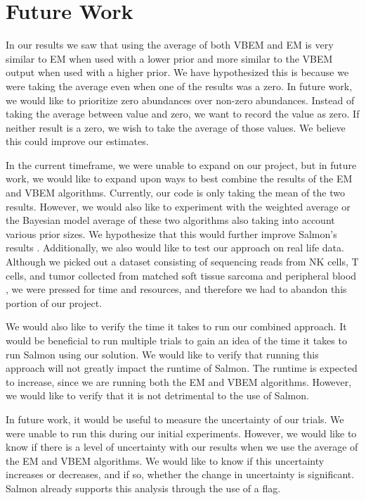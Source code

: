 \section{Future Work}
In our results we saw that using the average of both VBEM and EM is very similar to EM 
when used with a lower prior and more similar to the VBEM output when used with a higher prior. 
We have hypothesized this is because we were taking the average even when one of the results was a 
zero. In future work, we would like to prioritize zero abundances over non-zero abundances. 
Instead of taking the average between value and zero, we want to record the value as zero. 
If neither result is a zero, we wish to take the average of those values. 
We believe this could improve our estimates. 

In the current timeframe, we were unable to expand on our project, but in future work, 
we would like to expand upon ways to best combine the results of the EM and VBEM algorithms. 
Currently, our code is only taking the mean of the two results. 
However, we would also like to experiment with the weighted average or the Bayesian model average 
of these two algorithms also taking into account various prior sizes. 
We hypothesize that this would further improve Salmon’s results \cite{patro_salmon_2017}. 
Additionally, we also would like to test our approach on real life data. 
Although we picked out a dataset consisting of sequencing reads from NK cells, T cells, 
and tumor collected from matched soft tissue sarcoma and peripheral blood \cite{judge_transcriptome_2022}, we were pressed 
for time and resources, and therefore we had to abandon this portion of our project.

We would also like to verify the time it takes to run our combined approach. 
It would be beneficial to run multiple trials to gain an idea of the time it takes to run 
Salmon using our solution. We would like to verify that running this approach will not greatly 
impact the runtime of Salmon. The runtime is expected to increase, since we are running both the 
EM and VBEM algorithms. However, we would like to verify that it is not detrimental to the use 
of Salmon. 

In future work, it would be useful to measure the uncertainty of our trials. 
We were unable to run this during our initial experiments. However, we would like to know if there 
is a level of uncertainty with our results when we use the average of the EM and VBEM algorithms. 
We would like to know if this uncertainty increases or decreases, and if so, whether the change in 
uncertainty is significant. Salmon already supports this analysis through the use of a flag. 
